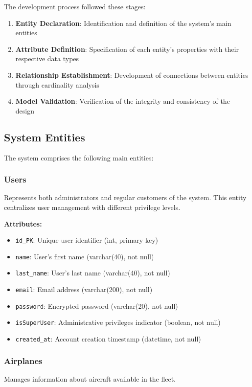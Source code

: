 \documentclass[conference]{IEEEtran}
\begin{document}
    The development process followed these stages:
    \begin{enumerate}
        \item \textbf{Entity Declaration}: Identification and definition of the system's main entities
        \item \textbf{Attribute Definition}: Specification of each entity's properties with their respective data types
        \item \textbf{Relationship Establishment}: Development of connections between entities through cardinality analysis
        \item \textbf{Model Validation}: Verification of the integrity and consistency of the design \end{enumerate}

    \subsection{System Entities}
    The system comprises the following main entities:

    \subsubsection{Users}
    Represents both administrators and regular customers of the system. This entity centralizes user management with different privilege levels.

    \textbf{Attributes:}
    \begin{itemize}
        \item \texttt{id\_PK}: Unique user identifier (int, primary key)
        \item \texttt{name}: User's first name (varchar(40), not null)
        \item \texttt{last\_name}: User's last name (varchar(40), not null)
        \item \texttt{email}: Email address (varchar(200), not null)
        \item \texttt{password}: Encrypted password (varchar(20), not null)
        \item \texttt{isSuperUser}: Administrative privileges indicator (boolean, not null)
        \item \texttt{created\_at}: Account creation timestamp (datetime, not null)
    \end{itemize}

    \subsubsection{Airplanes}
    Manages information about aircraft available in the fleet.
\end{document}
